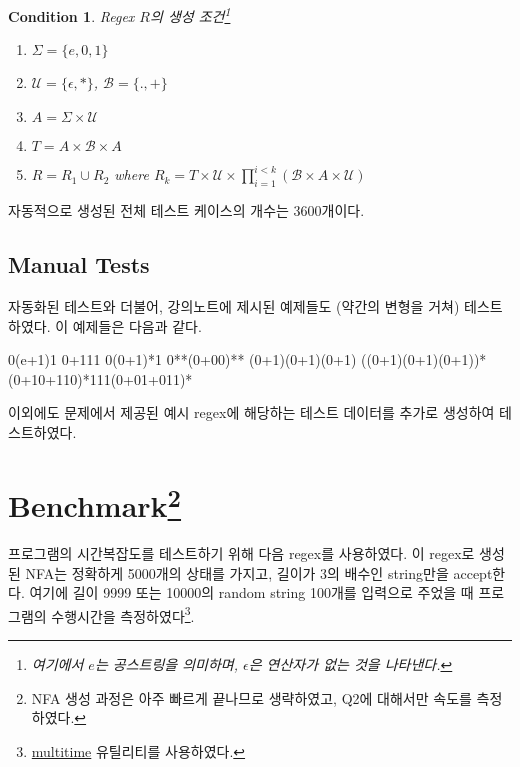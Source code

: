 \documentclass[a4paper,10pt]{scrartcl}
\newtheorem{cond}{Condition}[section]
\numberwithin{figure}{section}
\numberwithin{table}{section}
\begin{document}
\begin{cond}\label{cond:regex} Regex $R$의 생성 조건\footnote{여기에서 $e$는 공스트링을 의미하며, $\epsilon$은 연산자가 없는 것을 나타낸다.}
  \begin{enumerate}
    \item $\Sigma = \{e, 0, 1\}$
    \item $\mathcal{U} = \{\epsilon, *\}$, $\mathcal{B} = \{., +\}$
    \item $A = \Sigma \times \mathcal{U}$
    \item $T = A \times \mathcal{B} \times A$
    \item $R = R_1 \cup R_2$ where $R_k = T \times \mathcal{U} \times \prod_{i = 1}^{i < k} (\mathcal{B} \times A \times \mathcal{U})$
  \end{enumerate}
\end{cond}

\noindent 자동적으로 생성된 전체 테스트 케이스의 개수는 3600개이다.

\subsection{Manual Tests}

자동화된 테스트와 더불어, 강의노트에 제시된 예제들도 (약간의 변형을 거쳐) 테스트하였다. 이 예제들은 다음과 같다.

\begin{codebox}
0(e+1)1
0+111
0(0+1)*1
0**(0+00)**
(0+1)(0+1)(0+1)
((0+1)(0+1)(0+1))*
(0+10+110)*111(0+01+011)*
\end{codebox}

\noindent 이외에도 문제에서 제공된 예시 regex에 해당하는 테스트 데이터를 추가로 생성하여 테스트하였다.

\section[Benchmark]{Benchmark\footnote{NFA 생성 과정은 아주 빠르게 끝나므로 생략하였고, Q2에 대해서만 속도를 측정하였다.}}

프로그램의 시간복잡도를 테스트하기 위해 다음 regex를 사용하였다. 이 regex로 생성된 NFA는 정확하게 5000개의 상태를 가지고, 길이가 3의 배수인 string만을 accept한다. 여기에 길이 9999 또는 10000의 random string 100개를 입력으로 주었을 때 프로그램의 수행시간을 측정하였다\footnote{\href{https://tratt.net/laurie/src/multitime/}{multitime} 유틸리티를 사용하였다.}.
\end{document}
